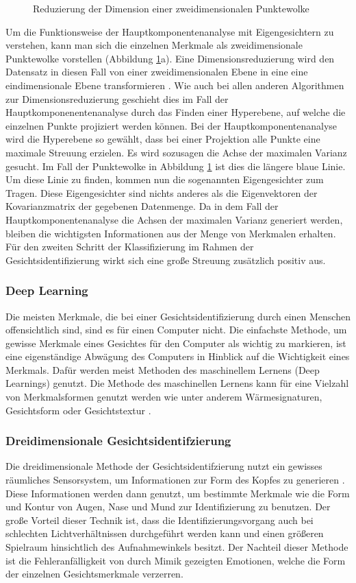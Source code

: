 \documentclass[doktyp=semarbeit, sprache=german]{TUBAFarbeiten}
\begin{document}
\begin{figure}
\begin{subfigure}[c]{0.49\textwidth}
\end{subfigure}
\caption{Reduzierung der Dimension einer zweidimensionalen Punktewolke }
\label{img:PCA}
\end{figure}Um die Funktionsweise der Hauptkomponentenanalyse mit Eigengesichtern zu verstehen, kann man sich die einzelnen Merkmale als zweidimensionale Punktewolke vorstellen (Abbildung \ref{img:PCA}a). Eine Dimensionsreduzierung wird den Datensatz in diesen Fall von einer zweidimensionalen Ebene in eine eine eindimensionale Ebene transformieren \cite{PCAPython}. Wie auch bei allen anderen Algorithmen zur Dimensionsreduzierung geschieht dies im Fall der Hauptkomponenentenanalyse durch das Finden einer Hyperebene, auf welche die einzelnen Punkte projiziert werden können. Bei der Hauptkomponentenanalyse wird die Hyperebene so gewählt, dass bei einer Projektion alle Punkte eine maximale Streuung erzielen. Es wird sozusagen die Achse der maximalen Varianz gesucht. Im Fall der Punktewolke in Abbildung \ref{img:PCA} ist dies die längere blaue Linie. Um diese Linie zu finden, kommen nun die sogenannten Eigengesichter zum Tragen. Diese Eigengesichter sind nichts anderes als die Eigenvektoren der Kovarianzmatrix der gegebenen Datenmenge. Da in dem Fall der Hauptkomponentenanalyse die Achsen der maximalen Varianz generiert werden, bleiben die wichtigsten Informationen aus der Menge von Merkmalen erhalten. Für den zweiten Schritt der Klassifizierung im Rahmen der Gesichtsidentifizierung wirkt sich eine große Streuung zusätzlich positiv aus.
\subsubsection{Deep Learning}
Die meisten Merkmale, die bei einer Gesichtsidentifizierung durch einen Menschen offensichtlich sind, sind es für einen Computer nicht. Die einfachste Methode, um gewisse Merkmale eines Gesichtes für den Computer als \glqq wichtig\grqq{} zu markieren, ist eine eigenständige Abwägung des Computers in Hinblick auf die Wichtigkeit eines Merkmals. Dafür werden meist Methoden des maschinellem Lernens (Deep Learnings) genutzt. Die Methode des maschinellen Lernens kann für eine Vielzahl von Merkmalsformen genutzt werden wie unter anderem Wärmesignaturen, Gesichtsform oder Gesichtstextur \cite{DeepLearning}.
\subsubsection{Dreidimensionale Gesichtsidentifzierung}
Die dreidimensionale Methode der Gesichtsidentifzierung nutzt ein gewisses räumliches Sensorsystem, um Informationen zur Form des Kopfes zu generieren \cite{Drei}. Diese Informationen werden dann genutzt, um bestimmte Merkmale wie die Form und Kontur von Augen, Nase und Mund zur Identifizierung zu benutzen. Der große Vorteil dieser Technik ist, dass die Identifizierungsvorgang auch bei schlechten Lichtverhältnissen durchgeführt werden kann und einen größeren Spielraum hinsichtlich des Aufnahmewinkels besitzt. Der Nachteil dieser Methode ist die Fehleranfälligkeit von durch Mimik gezeigten Emotionen, welche die Form der einzelnen Gesichtsmerkmale verzerren.
\end{document}
